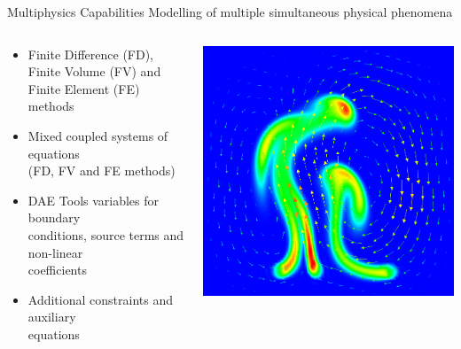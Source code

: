 \documentclass[compress,newPxFont,sthlmFooter]{beamer}
\begin{document}
\begin{frame}{Multiphysics Capabilities}
    Modelling of multiple simultaneous physical phenomena
    \begin{columns}[c]
      \begin{column}{0.6\paperwidth}
        {\small
        \begin{itemize}
            \item \alert{Finite Difference} (FD), \alert{Finite Volume} (FV) and \alert{Finite Element} (FE) methods
            \item Mixed coupled systems of equations \\ 
                  (FD, FV and FE methods)
            \item DAE Tools variables for boundary \\
                  conditions, source terms and non-linear \\
                  coefficients
            \item Additional constraints and auxiliary \\
                  equations
        \end{itemize}
        }
      \end{column}
      
      \begin{column}{0.27\paperwidth}
        \begin{center}
          \includegraphics[align=c, width=0.25\paperwidth]{buoyancy.png}
        \end{center}
      \end{column}
    \end{columns}
\end{frame}
\end{document}

